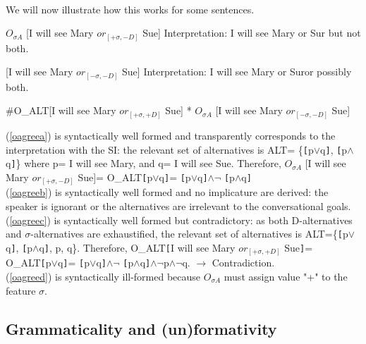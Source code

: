\documentclass[a4paper,11pt]{article}
\newcommand{\reff}[1]{(\ref{#1})}
\begin{document}
\paragraph{}
We will now illustrate how this works for some sentences.
\begin{exe}
\ex\label{oagree} \begin{xlist}
\ex\label{oagreea} \begin{xlist}
\ex\label{oagreeaa} $O_{\sigma A}$ [I will see Mary $or_{[+\sigma, -D]}$ Sue]
\ex\label{oagreeab} Interpretation: I will see Mary or Sur but not both.
\end{xlist}
\ex\label{oagreeb} \begin{xlist}
\ex\label{oagreeba} [I will see Mary $or_{[-\sigma, -D]}$ Sue]
\ex\label{oagreebb} Interpretation: I will see Mary or Suror possibly both.
\end{xlist}
\ex\label{oagreec} \#O_{ALT}[I will see Mary $or_{[+\sigma,+D]}$ Sue]
\ex\label{oagreed} * $O_{\sigma A}$ [I will see Mary $or_{[-\sigma, -D]}$ Sue]
\end{xlist}
\end{exe}

\reff{oagreea} is syntactically well formed and transparently corresponds to the interpretation with the SI: the relevant set of alternatives is ALT= \{\verb![!p$\vee$q\verb!]!, \verb![!p$\wedge$q\verb!]!\} where p= I will see Mary, and q= I will see Sue. Therefore, $O_{\sigma A}$ [I will see Mary $or_{[+\sigma, -D]}$ Sue]= O_{ALT}\verb![!p$\vee$q\verb!]!= \verb![!p$\vee$q\verb!]!$\wedge\neg$ \verb![!p$\wedge$q\verb!]!
\\\reff{oagreeb} is syntactically well formed and no implicature  are derived: the speaker is ignorant or the alternatives are irrelevant to the conversational goals.
\\\reff{oagreec} is syntactically well formed but contradictory: as both D-alternatives and $\sigma$-alternatives are exhaustified, the relevant set of alternatives is ALT=\{\verb![!p$\vee$q\verb!]!, \verb![!p$\wedge$q\verb!]!, p, q\}. Therefore, O_{ALT}\verb![!I will see Mary $or_{[+\sigma,+D]}$ Sue\verb!]!= O_{ALT}\verb![!p$\vee$q\verb!]!= \verb![!p$\vee$q\verb!]!$\wedge\neg$ \verb![!p$\wedge$q\verb!]!$\wedge\neg$p$\wedge\neg$q. $\rightarrow$ Contradiction.
\\\reff{oagreed} is syntactically ill-formed because $O_{\sigma A}$  must assign value "+" to the feature $\sigma$.

\subsection{Grammaticality and (un)formativity}
\end{document}
